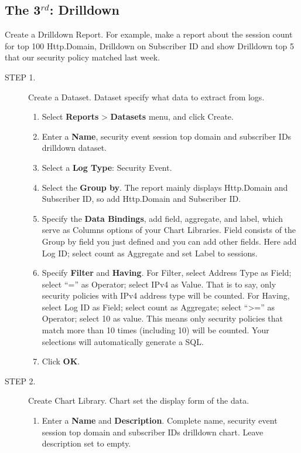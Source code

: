 \subsection*{\hypertarget{link:The 3rd: Drilldown}{The 3$^{rd}$: Drilldown}}
\label{sec:appendix_f:report:drilldown}

Create a Drilldown Report. For example, make a report about the session count for top 100 Http.Domain, Drilldown on Subscriber ID and show Drilldown top 5 that our security policy matched last week.

\begin{description}
    \item[STEP 1.]	Create a Dataset. Dataset specify what data to extract from logs.
    \begin{enumerate}
        \item Select \textbf{Reports} > \textbf{Datasets} menu, and click Create.
        \item Enter a \textbf{Name}, security event session top domain and subscriber IDs drilldown dataset.
        \item Select a \textbf{Log Type}: Security Event.
        \item Select the \textbf{Group by}. The report mainly displays Http.Domain and Subscriber ID, so add Http.Domain and Subscriber ID.
        \item Specify the \textbf{Data Bindings}, add field, aggregate, and label, which serve as Columns options of your Chart Libraries. Field consists of the Group by field you just defined and you can add other fields. Here add Log ID; select count as Aggregate and set Label to sessions.
        \item Specify \textbf{Filter} and \textbf{Having}. For Filter, select Address Type as Field; select “=” as Operator; select IPv4 as Value. That is to say, only security policies with IPv4 address type will be counted. For Having, select Log ID as Field; select count as Aggregate; select “>=” as Operator; select 10 as value. This means only security policies that match more than 10 times (including 10) will be counted. Your selections will automatically generate a SQL.
        \item Click \textbf{OK}.
    \end{enumerate}
    \item[STEP 2.]	Create Chart Library. Chart set the display form of the data.
    \begin{enumerate}
        \item Enter a \textbf{Name} and \textbf{Description}. Complete name, security event session top domain and subscriber IDs drilldown chart. Leave description set to empty. 

\end{enumerate}
\end{description}
